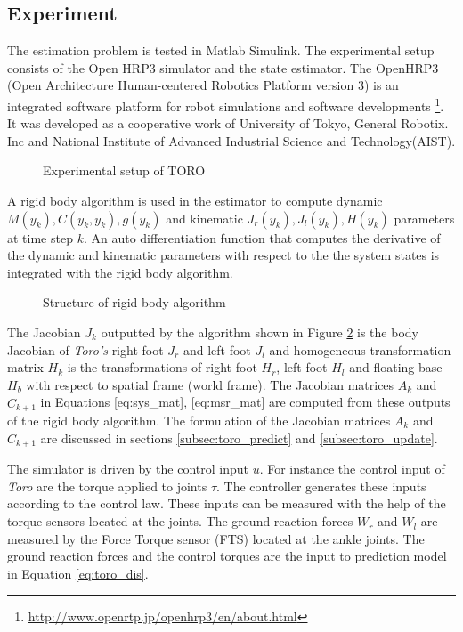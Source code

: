 \subsection{Experiment}
\label{subsec:toro_exp}
The estimation problem is tested in Matlab Simulink. The experimental setup consists of the Open HRP3 simulator and the state estimator. The OpenHRP3 (Open Architecture Human-centered Robotics Platform version 3) is an integrated software platform for robot simulations and software developments \footnote{\url{http://www.openrtp.jp/openhrp3/en/about.html}}. It was developed as a cooperative work of University of Tokyo, General Robotix. Inc and National Institute of Advanced Industrial Science and Technology(AIST).

\begin{figure}[H]
    \centering
    
    \caption{Experimental setup of TORO}
    \label{fig:toro_exp}
\end{figure}

A rigid body algorithm is used in the estimator to compute dynamic $M(y_k), C(y_k,\dot y_k), g(y_k)$ and kinematic $J_r(y_k), J_l(y_k), H(y_k)$ parameters at time step $k$. An auto differentiation function that computes the derivative of the dynamic and kinematic parameters with respect to the the system states is integrated with the rigid body algorithm. 
\begin{figure}[H]
    \centering
    
    \caption{Structure of rigid body algorithm}
    \label{fig:luc_dyn}
\end{figure}
The Jacobian $J_k$ outputted by the algorithm shown in Figure \ref{fig:luc_dyn} is the body Jacobian of \emph{Toro's} right foot $J_r$ and left foot $J_l$ and homogeneous transformation matrix $H_k$ is the transformations of right foot $H_r$, left foot $H_l$ and floating base $H_b$ with respect to spatial frame (world frame).
The Jacobian matrices $A_k$ and $\hat C_{k+1}$ in Equations \ref{eq:sys_mat}, \ref{eq:msr_mat} are computed from these outputs of the rigid body algorithm. The formulation of the Jacobian matrices $A_k$ and $\hat C_{k+1}$ are discussed in sections \ref{subsec:toro_predict} and \ref{subsec:toro_update}. 

The simulator is driven by the control input $u$. For instance the control input of \emph{Toro} are the torque applied to joints $\tau$. The controller generates these inputs according to the control law. These inputs can be measured with the help of the torque sensors located at the joints. The ground reaction forces $W_r$ and $W_l$ are measured by the Force Torque sensor (FTS) located at the ankle joints. The ground reaction forces and the control torques are the input to prediction model in Equation \ref{eq:toro_dis}.

